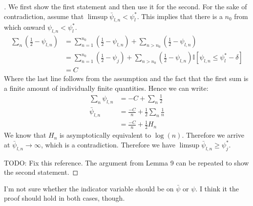 \begin{proof}[]
    We first show the first statement and then use it for the second. For the
    sake of contradiction, assume that $\limsup \bar{\psi}_{l, n} <
    \psi_l^*$. This implies that there is a $n_0$ from which onward $\psi_{l,
    n} < \psi_l^*$.
    \begin{align}
      \sum_n (\frac{1}{2} - \psi_{l, n}) &= \sum_{n=1}^{n_0} (\frac{1}{2} -
          \psi_{l, n}) + \sum_{n > n_0} (\frac{1}{2} - \psi_{l, n}) \\
        &= \sum_{n=1}^{n_0} (\frac{1}{2} - \psi_j) + \sum_{n > n_0}
            (\frac{1}{2} - \psi_{l, n})\mathbb{I}[\psi_{l, n} \leq \psi_l^* -
            \delta] \\
        &= C
    \end{align}
    Where the last line follows from the assumption and the fact that the first
    sum is a finite amount of individually finite quantities. Hence we can
    write:
    \begin{align}
      \sum_n \psi_{l, n} &= -C + \sum_n \frac{1}{2} \\
      \bar{\psi}_{l, n} &= \frac{-C}{n} + \frac{1}{2}\sum_n\frac{1}{n} \\
        &= \frac{-C}{n} + \frac{1}{2} H_n
    \end{align}
    We know that $H_n$ is asymptotically equivalent to $\log(n)$. Therefore we
    arrive at $\bar{\psi}_{l, n} \rightarrow \infty$, which is a contradiction.
    Therefore we have $\limsup \bar{\psi}_{l, n} \geq \psi_j^*$.

    TODO: Fix this reference.
    The argument from Lemma 9 can be repeated to show the second statement.
  \end{proof}

  \begin{remark}[Kevin 19/10/29]
    I'm not sure whether the indicator variable should be on $\bar{\psi}$ or
    $\psi$. I think it the proof should hold in both cases, though.
  \end{remark}

